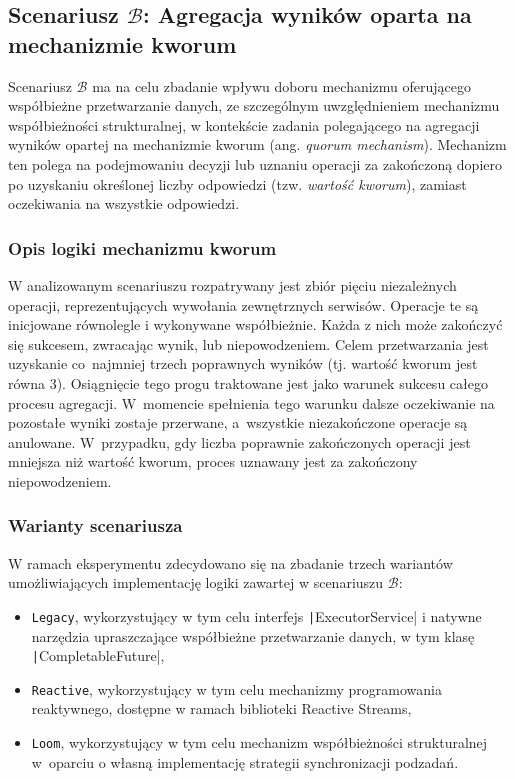 \subsection{Scenariusz \ensuremath{\mathcal{B}}: Agregacja wyników oparta na mechanizmie kworum}
\label{sec:description-scenario-B}

Scenariusz $\mathcal{B}$ ma na celu zbadanie wpływu doboru mechanizmu oferującego współbieżne przetwarzanie danych, ze szczególnym uwzględnieniem mechanizmu współbieżności strukturalnej, w kontekście zadania polegającego na agregacji wyników opartej na mechanizmie kworum (ang. \emph{quorum mechanism}). Mechanizm ten polega na podejmowaniu decyzji lub uznaniu operacji za zakończoną dopiero po uzyskaniu określonej liczby odpowiedzi (tzw. \emph{wartość kworum}), zamiast oczekiwania na wszystkie odpowiedzi.

\subsubsection{Opis logiki mechanizmu kworum}
W analizowanym scenariuszu rozpatrywany jest zbiór pięciu niezależnych operacji, reprezentujących wywołania zewnętrznych serwisów. Operacje te są inicjowane równolegle i wykonywane współbieżnie. Każda z nich może zakończyć się sukcesem, zwracając wynik, lub niepowodzeniem. Celem przetwarzania jest uzyskanie co~najmniej trzech poprawnych wyników (tj. wartość kworum jest równa $3$). Osiągnięcie tego progu traktowane jest jako warunek sukcesu całego procesu agregacji. W~momencie spełnienia tego warunku dalsze oczekiwanie na pozostałe wyniki zostaje przerwane, a~wszystkie niezakończone operacje są anulowane. W~przypadku, gdy liczba poprawnie zakończonych operacji jest mniejsza niż wartość kworum, proces uznawany jest za zakończony niepowodzeniem.

\subsubsection{Warianty scenariusza}
W ramach eksperymentu zdecydowano się na zbadanie trzech wariantów umożliwiających implementację logiki zawartej w scenariuszu $\mathcal{B}$:
\begin{itemize}
    \itemsep0em
    \item \texttt{Legacy}, wykorzystujący w tym celu interfejs \texttt|ExecutorService| i natywne narzędzia upraszczające współbieżne przetwarzanie danych, w tym klasę \texttt|CompletableFuture|,
    \item \texttt{Reactive}, wykorzystujący w tym celu mechanizmy programowania reaktywnego, dostępne w ramach biblioteki Reactive Streams, 
    \item \texttt{Loom}, wykorzystujący w tym celu mechanizm współbieżności strukturalnej w~oparciu o własną implementację strategii synchronizacji podzadań.
\end{itemize}

